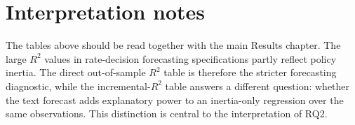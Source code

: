 \section{Interpretation notes}
\label{app:a2_interpretation_notes}

The tables above should be read together with the main Results chapter. The
large $R^2$ values in rate-decision forecasting specifications partly reflect
policy inertia. The direct out-of-sample $R^2$ table is therefore the stricter
forecasting diagnostic, while the incremental-$R^2$ table answers a different
question: whether the text forecast adds explanatory power to an inertia-only
regression over the same observations. This distinction is central to the
interpretation of RQ2.